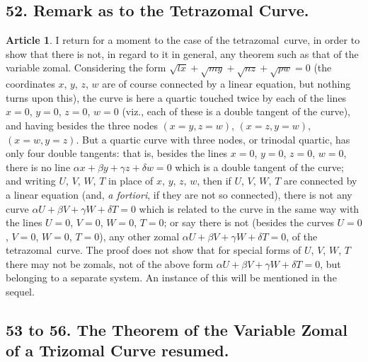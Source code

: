 \documentclass[11pt,a4paper]{article}
\theoremstyle{definition}
\newtheorem{art}{Article}
\newcommand{\tetrazomal}{tetrazomal}
\begin{document}
\subsection{52. Remark as to the Tetrazomal Curve.}

\begin{art}
I return for a moment to the case of the \tetrazomal\ curve, in order to show that there is not, in regard to it in general, any theorem such as that of the variable zomal. Considering the form $\sqrt{lx} + \sqrt{my} + \sqrt{nz} + \sqrt{pw} = 0$ (the coordinates $x$, $y$, $z$, $w$ are of course connected by a linear equation, but nothing turns upon this), the curve is here a quartic touched twice by each of the lines $x = 0$, $y = 0$, $z = 0$, $w = 0$ (viz., each of these is a double tangent of the curve), and having besides the three nodes $(x = y, z = w)$, $(x = z, y = w)$, $(x = w, y = z)$. But a quartic curve with three nodes, or trinodal quartic, has only four double tangents: that is, besides the lines $x = 0$, $y = 0$, $z = 0$, $w = 0$, there is no line $\alpha x + \beta y + \gamma z + \delta w = 0$ which is a double tangent of the curve; and writing $U$, $V$, $W$, $T$ in place of $x$, $y$, $z$, $w$, then if $U$, $V$, $W$, $T$ are connected by a linear equation (and, \textit{a fortiori}, if they are not so connected), there is not any curve $\alpha U + \beta V + \gamma W + \delta T = 0$ which is related to the curve in the same way with the lines $U = 0$, $V = 0$, $W = 0$, $T = 0$; or say there is not (besides the curves $U = 0$, $V = 0$, $W = 0$, $T = 0$), any other zomal $\alpha U + \beta V + \gamma W + \delta T = 0$, of the \tetrazomal\ curve. The proof does not show that for special forms of $U$, $V$, $W$, $T$ there may not be zomals, not of the above form $\alpha U + \beta V + \gamma W + \delta T = 0$, but belonging to a separate system. An instance of this will be mentioned in the sequel.
\end{art}



\subsection{53 to 56. The Theorem of the Variable Zomal of a Trizomal Curve resumed.}
\end{document}
